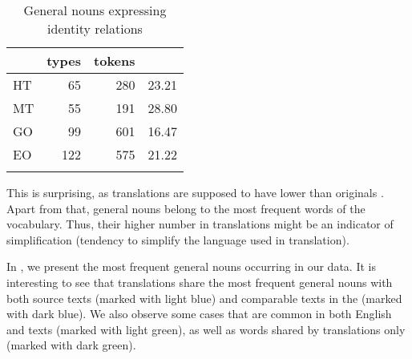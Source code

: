 \documentclass[output=paper]{langsci/langscibook.cls}
\begin{document}
\begin{table}
\begin{tabular}{lrrr}
\lsptoprule
	&	types&tokens&\isi{TTR}\\
\midrule
HT & 65  & 280 & 23.21\\
MT & 55    & 191 & 28.80\\
GO & 99  & 601 & 16.47\\
EO & 122 & 575 & 21.22\\
\lspbottomrule
\end{tabular}
\caption{General nouns expressing identity relations}
\label{table:ttrgennoun}
\end{table}

This is surprising, as translations are supposed to have lower  than originals \citep[as stated by][]{Croco2012}. Apart from that, general nouns belong to the most frequent words of the vocabulary. Thus, their higher number in translations might be an indicator of simplification (tendency to simplify the language used in translation).

In , we present the most frequent general nouns occurring in our data. It is interesting to see that translations share the most frequent general nouns with both source texts 
(marked with light blue)
and comparable texts in the  
(marked with dark blue). 
We also observe some cases that are common in both English and  texts 
(marked with light green), 
as well as words shared by translations only 
(marked with dark green).

\newcommand{\colorone}{yellow}
\newcommand{\colortwo}{purple!30}
\newcommand{\colorthree}{brown!60}
\newcommand{\colorfour}{cyan!40} 
\end{document}
